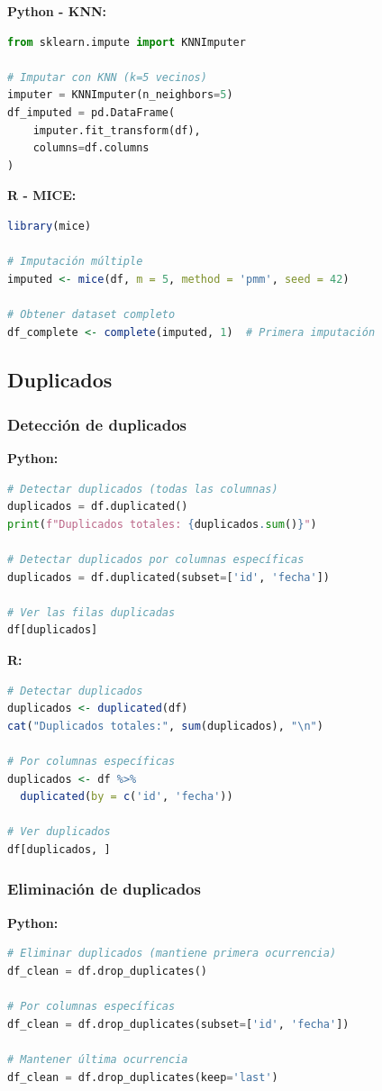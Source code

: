\documentclass[a4paper,11pt]{article}
\begin{document}
\textbf{Python - KNN:}
\begin{lstlisting}[language=Python]
from sklearn.impute import KNNImputer

# Imputar con KNN (k=5 vecinos)
imputer = KNNImputer(n_neighbors=5)
df_imputed = pd.DataFrame(
    imputer.fit_transform(df),
    columns=df.columns
)
\end{lstlisting}

\textbf{R - MICE:}
\begin{lstlisting}[language=R]
library(mice)

# Imputación múltiple
imputed <- mice(df, m = 5, method = 'pmm', seed = 42)

# Obtener dataset completo
df_complete <- complete(imputed, 1)  # Primera imputación
\end{lstlisting}

\subsection{Duplicados}

\subsubsection{Detección de duplicados}

\textbf{Python:}
\begin{lstlisting}[language=Python]
# Detectar duplicados (todas las columnas)
duplicados = df.duplicated()
print(f"Duplicados totales: {duplicados.sum()}")

# Detectar duplicados por columnas específicas
duplicados = df.duplicated(subset=['id', 'fecha'])

# Ver las filas duplicadas
df[duplicados]
\end{lstlisting}

\textbf{R:}
\begin{lstlisting}[language=R]
# Detectar duplicados
duplicados <- duplicated(df)
cat("Duplicados totales:", sum(duplicados), "\n")

# Por columnas específicas
duplicados <- df %>%
  duplicated(by = c('id', 'fecha'))

# Ver duplicados
df[duplicados, ]
\end{lstlisting}

\subsubsection{Eliminación de duplicados}

\textbf{Python:}
\begin{lstlisting}[language=Python]
# Eliminar duplicados (mantiene primera ocurrencia)
df_clean = df.drop_duplicates()

# Por columnas específicas
df_clean = df.drop_duplicates(subset=['id', 'fecha'])

# Mantener última ocurrencia
df_clean = df.drop_duplicates(keep='last')
\end{lstlisting}
\end{document}

